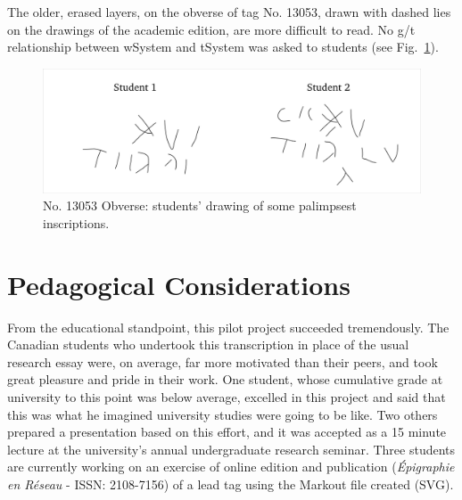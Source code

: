 \documentclass[amsthm,ebook]{saparticle}
\begin{document}


\newpage
The older, erased layers, on the obverse of tag No. 13053, drawn with dashed lies on the drawings of the academic edition, are more difficult to read. No
g/t relationship between wSystem and tSystem was asked to students (see Fig.~\ref{fig:4}).

\begin{figure}[!hbp]
\centering
\includegraphics[scale=0.25]{EAGLE16lameetalteaching-img012.png}
\caption{No. 13053 Obverse: students' drawing of some palimpsest inscriptions.}
\label{fig:4}
\end{figure}


\section{Pedagogical Considerations}


\noindent From the educational standpoint, this pilot project succeeded tremendously. The Canadian students who undertook this
transcription in place of the usual research essay were, on average, far more motivated than their peers, and took
great pleasure and pride in their work. One student, whose cumulative grade at university to this point was below
average, excelled in this project and said that this was what he imagined university studies were going to be like. Two
others prepared a presentation based on this effort, and it was accepted as a 15 minute lecture at the university’s
annual undergraduate research seminar. Three students are currently working on an exercise of online edition and publication (\emph{Épigraphie en Réseau} - ISSN: 2108-7156) of a lead tag using the Markout file created (SVG).
\end{document}
